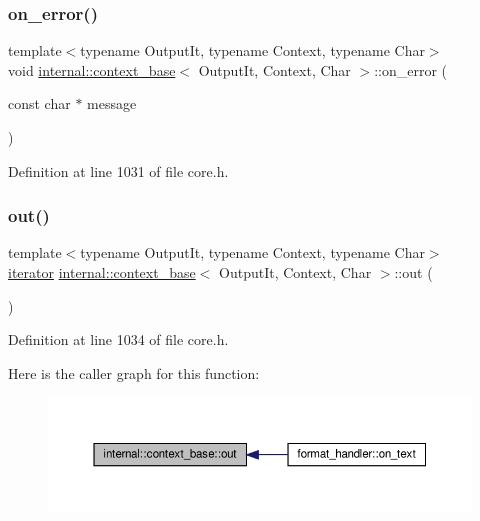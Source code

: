 \subsubsection{\texorpdfstring{on\+\_\+error()}{on\_error()}}
{\footnotesize\ttfamily template$<$typename Output\+It, typename Context, typename Char$>$ \\
void \hyperlink{classinternal_1_1context__base}{internal\+::context\+\_\+base}$<$ Output\+It, Context, Char $>$\+::on\+\_\+error (\begin{DoxyParamCaption}\item[{const char $\ast$}]{message }\end{DoxyParamCaption})\hspace{0.3cm}{\ttfamily [inline]}}



Definition at line 1031 of file core.\+h.

\mbox{\label{classinternal_1_1context__base_ab77c1d5e2cf72ef323e1599be8567fee}} 
\subsubsection{\texorpdfstring{out()}{out()}}
{\footnotesize\ttfamily template$<$typename Output\+It, typename Context, typename Char$>$ \\
\hyperlink{classinternal_1_1context__base_a6486e3c9656c10eb99a4731fb169e51b}{iterator} \hyperlink{classinternal_1_1context__base}{internal\+::context\+\_\+base}$<$ Output\+It, Context, Char $>$\+::out (\begin{DoxyParamCaption}{ }\end{DoxyParamCaption})\hspace{0.3cm}{\ttfamily [inline]}}



Definition at line 1034 of file core.\+h.

Here is the caller graph for this function\+:
\nopagebreak
\begin{figure}[H]
\begin{center}
\leavevmode
\includegraphics[width=350pt]{classinternal_1_1context__base_ab77c1d5e2cf72ef323e1599be8567fee_icgraph}
\end{center}
\end{figure}
\mbox{\label{classinternal_1_1context__base_a8b2dea2761b5bd19dfe60435a68f80d6}} 
